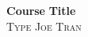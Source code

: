 \documentclass[11pt]{article}
\theoremstyle{definition}\newtheorem{definition}{Definition}
\theoremstyle{definition}\newtheorem{question}{Question}
\theoremstyle{definition}\newtheorem*{solution}{Solution}
\theoremstyle{definition}\newtheorem{example}{Example}
\theoremstyle{definition}\newtheorem{notation}{Notation}
\theoremstyle{theorem}\newtheorem{theorem}{Theorem}
\theoremstyle{theorem}\newtheorem{corollary}{Corollary}
\theoremstyle{theorem}\newtheorem{lemma}{Lemma}
\theoremstyle{theorem}\newtheorem{proposition}{Proposition}
\begin{document}
\noindent \textbf{Course} \hfill \textbf{Title} \\
\textsc{Type} \hfill \textsc{Joe Tran}
\end{document}
